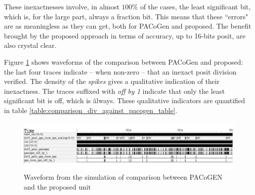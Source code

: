These inexactnesses involve, in almost $100 \%$ of the cases, the least significant bit, which is, for the large part, always a fraction bit. This means that these ``errors" are as meaningless as they can get, both for PACoGen and proposed.
The benefit brought by the proposed approach in terms of accuracy, up to 16-bits posit, are also crystal clear.


Figure \ref{fig:comparison_against_pacogogen_dut_waveforms} shows waveforms of the comparison between PACoGen and proposed: the last four traces indicate -- when non-zero -- that an inexact posit division verified. The density of the \textit{spikes} gives a qualitative indication of their inexactness. The traces suffixed with \textit{off by 1} indicate that only the least significant bit is off, which is \~ always. These qualitative indicators are quantified in table \ref{table:comparison_div_against_pacogen_table}.


\begin{figure}
        \includegraphics[width=\textwidth]{figures/waveform_div_against_pacogen.pdf}
        \caption{Waveform from the simulation of comparison between PACoGEN and the proposed unit}
        \label{fig:comparison_against_pacogogen_dut_waveforms}
\end{figure}




